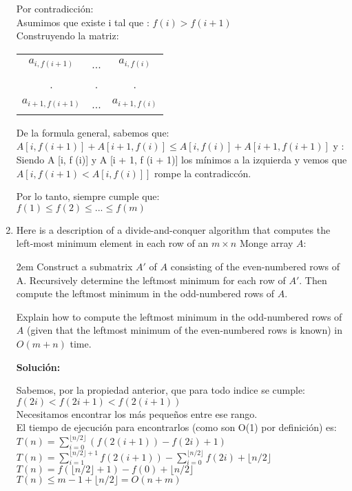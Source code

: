 \documentclass{article}
\begin{document}
\begin{enumerate}[label=\textbf{\alph*.}]
  Por contradicción:\\
  Asumimos que existe i tal que : $f(i)>f(i+1)$\\
  Construyendo la matriz:\\
  \begin{center}
    \begin{tabular}{ccc}
      $a_{i,f(i+1)}$ & ... & $a_{i,f(i)}$\\
      . & . & .\\
      $a_{i+1,f(i+1)}$ &  ... & $a_{i+1,f(i)}$
      \end{tabular}
  \end{center}
  De la formula general, sabemos que:\\
  $A[i,f(i+1)] + A[i+1, f(i)] \leq A[i,f(i)] + A[i+1, f(i+1)]$ y :\\
  Siendo A [i, f (i)] y A [i + 1, f (i + 1)] los mínimos a la izquierda y vemos que $A[i,f(i+1) < A[i,f(i)]]$ rompe la contradiccón.
  
  Por lo tanto, siempre cumple que:\\
  $f(1) \leq f(2) \leq ... \leq f(m)$

  \item Here is a description of a divide-and-conquer algorithm that computes the left-most minimum element in each row of an $m \times n$ Monge array $A$:
  
  \begingroup
  \leftskip2em
  \rightskip\leftskip
  Construct a submatrix $A'$ of $A$ consisting of the even-numbered rows of A. Recursively determine the leftmost minimum for each row of $A'$. Then compute the leftmost minimum in the odd-numbered rows of $A$.
  \par
  \endgroup

  Explain how to compute the leftmost minimum in the odd-numbered rows of $A$ (given that the leftmost minimum of the even-numbered rows is known) in $O(m+n)$ time.
  
  \textbf{Solución:}
  
  Sabemos, por la propiedad anterior, que para todo indice se cumple:\\
  $f(2i) < f(2i+1) < f(2(i+1))$\\
  Necesitamos encontrar los más pequeños entre ese rango.\\
  El tiempo de ejecución para encontrarlos (como son O(1) por definición) es:\\
  $T(n) = \sum_{i=0}^{\lfloor n/2 \rfloor} ( f(2(i+1)) - f(2i)+1)$\\
  $T(n) = \sum_{i=1}^{\lfloor n/2 \rfloor+1} f(2(i+1)) - \sum_{i=0}^{\lfloor n/2 \rfloor} f(2i) + \lfloor n/2 \rfloor$\\
  $T(n) = f(\lfloor n/2 \rfloor +1) - f(0)+\lfloor n/2 \rfloor$\\
  $T(n) \leq m-1 + \lfloor n/2 \rfloor = O(n+m)$
  

\end{enumerate}
\end{document}
